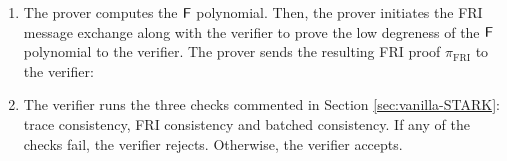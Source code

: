 \begin{protocol}
\begin{enumerate}
  \item The prover computes the $\textsf{F}$ polynomial. Then, the prover initiates the FRI message exchange along with the verifier to prove the low degreness of the $\textsf{F}$ polynomial to the verifier. The prover sends the resulting FRI proof $\pi_{\text{FRI}}$ to the verifier: 

  \item The verifier runs the three checks commented in Section \ref{sec:vanilla-STARK}: trace consistency, FRI consistency and batched consistency. If any of the checks fail, the verifier rejects. Otherwise, the verifier accepts.
\end{enumerate}
\end{protocol}

